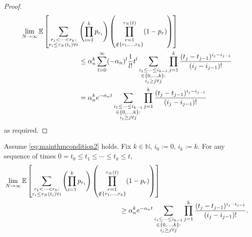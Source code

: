 \begin{proof}
\begin{align*}
&\lim_{N\to\infty} \E \left[ 
        \sum_{\substack{r_1 <\dots< r_k :\\ r_i \leq \tau_N(t_i) \forall i}}
        \left( \prod_{i=1}^k p_{r_i} \right)
        \left( \prod_{\substack{r=1 \\ \notin \{r_1,\dots,r_k\} }}^{\tau_N(t)} 
        (1-p_r) \right) \right] \\
&\hspace{3cm}\leq \alpha_n^k
        \sum_{l=0}^{\infty} (-\alpha_n)^l \frac{1}{l!} t^l
        \sum_{\substack{i_1\leq \dots\leq i_{k-1}\\ \in \{0,\dots,k\} :
        \\ i_j \geq j \forall j}} 
        \prod_{j=1}^k \frac{(t_j - t_{j-1})^{i_j - i_{j-1}}}{(i_j - i_{j-1})! } \\
&\hspace{3cm}= \alpha_n^k e^{-\alpha_n t}
        \sum_{\substack{i_1\leq \dots\leq i_{k-1}\\ \in \{0,\dots,k\} :
        \\ i_j \geq j \forall j}} 
        \prod_{j=1}^k \frac{(t_j - t_{j-1})^{i_j - i_{j-1}}}{(i_j - i_{j-1})! }
\end{align*}
as required.
\end{proof}




\begin{lemma}\label{thm:inductionLB}
Assume \eqref{eq:mainthmcondition2} holds.
Fix $k \in \mathbb{N}$, $i_0:=0$, $i_k:=k$. For any sequence of times
$0 = t_0 \leq t_1 \leq \cdots \leq t_k \leq t$,
\begin{align*}
&\lim_{N\to\infty} \E \left[ 
        \sum_{\substack{r_1 <\dots< r_k :\\ r_i \leq \tau_N(t_i) \forall i}}
        \left( \prod_{i=1}^k p_{r_i} \right)
        \left( \prod_{\substack{r=1 \\ \notin \{r_1,\dots,r_k\} }}^{\tau_N(t)} 
        (1-p_r) \right) \right] \\
&\hspace{6cm}\geq \alpha_n^k e^{-\alpha_n t}
        \sum_{\substack{i_1\leq \dots\leq i_{k-1}\\ \in \{0,\dots,k\} :
        \\ i_j \geq j \forall j}} 
        \prod_{j=1}^k \frac{(t_j - t_{j-1})^{i_j - i_{j-1}}}{(i_j - i_{j-1})! } .
\end{align*}
\end{lemma}


